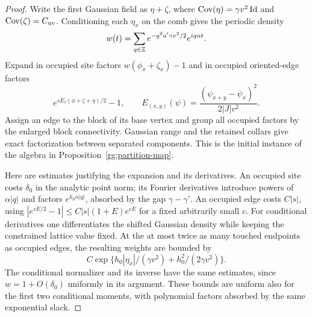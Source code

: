 \begin{proof}
Write the first Gaussian field as $\eta+\zeta$, where
$\operatorname{Cov}(\eta)=\gamma v^2\operatorname{Id}$ and $\operatorname{Cov}(\zeta)=C_{\rm uv}$.
Conditioning each $\eta_x$ on the comb gives the periodic density
\[
 w(t)=\sum_{q\in\mathbb Z}e^{-q^2a'\gamma v^2/2}e^{iq\alpha t}.
\]
Expand in occupied site factors $w(\phi_x+\zeta_x)-1$ and in
occupied oriented-edge factors
\[
 e^{sE_\ell(\phi+\zeta+\eta)/2}-1,
 \qquad E_{(x,y)}(\psi)
       =\frac{(\psi_{x+y}-\psi_x)^2}{2|J|v^2}.
\]
Assign an edge to the block of its base vertex and group all occupied
factors by the enlarged block connectivity.  Gaussian range and the
retained collars give exact factorization between separated components.
This is the initial instance of the algebra in
Proposition~\ref{rg:partition-map}.

Here are estimates justifying the expansion and its derivatives.  An
occupied site costs $\delta_0$ in the analytic point norm; its Fourier
derivatives introduce powers of $\alpha|q|$ and factors
$e^{h_0\alpha|q|}$, absorbed by the gap $\gamma-\gamma'$.
An occupied edge costs $C|s|$, using
$|e^{sE/2}-1|\le C|s|(1+E)e^{cE}$ for a fixed arbitrarily small $c$.
For conditional derivatives one differentiates the shifted Gaussian
density while keeping the constrained lattice value fixed.  At the at
most twice as many touched endpoints as occupied edges, the resulting
weights are bounded by
\[
 C\exp\{h_0|\eta_x|/(\gamma v^2)+h_0^2/(2\gamma v^2)\}.
\]
The conditional normalizer and its inverse have the same estimates,
since $w=1+O(\delta_0)$ uniformly in its argument.  These bounds are
uniform also for the first two conditional moments, with polynomial
factors absorbed by the same exponential slack.


\end{proof}
